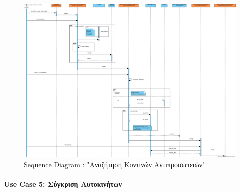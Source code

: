 \documentclass{../ol-softwaremanual}
\begin{document}
	
	\begin{figure}[htbp!]
		\centering
		\includegraphics[scale=0.215]{img/seq_search_nearby_dealerships.png}
		\caption{\en Sequence Diagram : "\gr Αναζήτηση Κοντινών Αντιπροσωπειών\en"\gr}
	\end{figure}
	
	\newpage
	
	\centering
	\paragraph{\en Use Case 5: \gr Σύγκριση Αυτοκινήτων}
	
\end{document}
